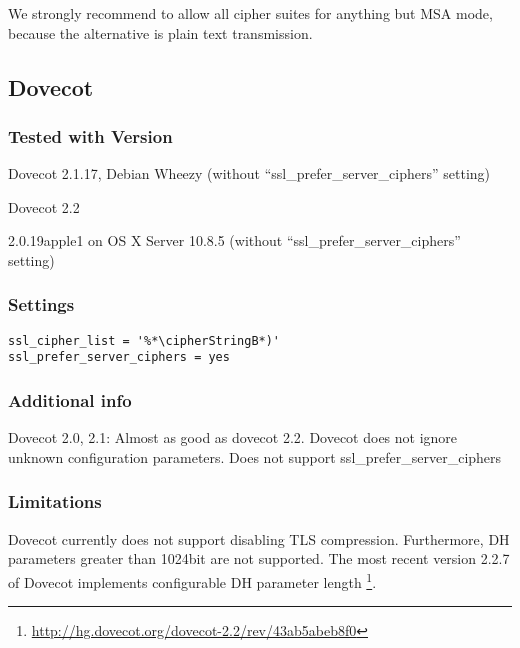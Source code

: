 
We strongly recommend to allow all cipher suites for anything but MSA
mode, because the alternative is plain text transmission.

\subsection{Dovecot}


\subsubsection{Tested with Version} 
\begin{itemize*}
  \item Dovecot 2.1.17, Debian Wheezy (without ``ssl\_prefer\_server\_ciphers'' setting)
  \item Dovecot 2.2
  \item 2.0.19apple1 on OS X Server 10.8.5 (without ``ssl\_prefer\_server\_ciphers'' setting)
\end{itemize*}

\subsubsection{Settings}

\begin{lstlisting}
ssl_cipher_list = '%*\cipherStringB*)'
ssl_prefer_server_ciphers = yes
\end{lstlisting}

\subsubsection{Additional info}
Dovecot 2.0, 2.1: Almost as good as dovecot 2.2. Dovecot does not ignore unknown configuration parameters. Does not support
ssl\_prefer\_server\_ciphers

\subsubsection{Limitations}
Dovecot currently does not support disabling TLS compression. Furthermore, DH
parameters greater than 1024bit are not supported. The most recent version
2.2.7 of Dovecot implements configurable DH parameter length
\footnote{\url{http://hg.dovecot.org/dovecot-2.2/rev/43ab5abeb8f0}}.


